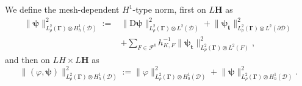 \documentclass[final,onefignum,onetabnum]{mousaviart}
\begin{document}
	\vspace*{1mm}
	\begin{definition} 
		\label{def:discrete-norm}
		We define the mesh-dependent $H^1$-type norm, first on $L\boldsymbol{H}$
		as 
		\begin{equation}
			\label{eq:discrete-norm-G}
			\begin{aligned}
			\lVert \boldsymbol{\psi} \rVert^2_{L^2_{\rho}(\boldsymbol{\Gamma}) \otimes H^1_h(\mathcal{D})}:= 
			&\lVert \mathrm{D} \boldsymbol{\psi}  \rVert_{L^2_{\rho}(\boldsymbol{\Gamma}) \otimes L^2(\mathcal{D})}^2 
			+
			\lVert \boldsymbol{\psi}_{\boldsymbol{t}} \rVert^2_{L^2_{\rho}(\boldsymbol{\Gamma}) \otimes L^2(\partial \mathcal{D})}
			\\
			&+
			\sum_{F \in \mathcal{F}^b}
			h_{K,F}^{-1}\lVert \boldsymbol{\psi}_{\boldsymbol{t}} \rVert^2_{L^2_{\rho}(\boldsymbol{\Gamma}) \otimes L^2(F)},
		\end{aligned}
		\end{equation}
		and then on $ LH \times L \boldsymbol{H}$ as 
		\begin{equation}
			\label{eq:discrete-norm-U-times-G}
			\lVert (\varphi, \boldsymbol{\psi})  \rVert_{L^2_{\rho}(\boldsymbol{\Gamma}) \otimes H^1_h( \mathcal{D})}^2
			:=
			\lVert \varphi \rVert_{L^2_{\rho}(\boldsymbol{\Gamma}) \otimes H^1_0( \mathcal{D})}^2
			+
			\lVert \boldsymbol{\psi} \rVert^2_{L^2_{\rho}(\boldsymbol{\Gamma}) \otimes H^1_h( \mathcal{D})}.
		\end{equation} 
	\end{definition}
	
\end{document}
